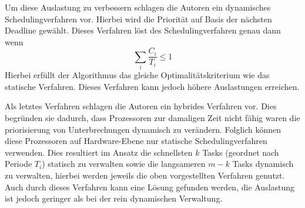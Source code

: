 \documentclass[DIN, pagenumber=false, fontsize=11pt, parskip=half]{scrartcl}
\begin{document}
\begin{enumerate}[label=\alph*)]
            Um diese Auslastung zu verbessern schlagen die Autoren ein dynamisches
            Schedulingverfahren vor. Hierbei wird die Priorität auf Basis der nächsten
            Deadline gewählt. Dieses Verfahren löst des Schedulingverfahren genau dann
            wenn
            \begin{equation}
                \sum_i \frac{C_i}{T_i} \leq 1
            \end{equation} 
            Hierbei erfüllt der Algorithmus das gleiche Optimalitätskriterium wie das
            statische Verfahren. Dieses Verfahren kann jedoch höhere Auslastungen
            erreichen.

            Als letztes Verfahren schlagen die Autoren ein hybrides Verfahren vor.
            Dies begründen sie dadurch, dass Prozessoren zur damaligen Zeit nicht
            fähig waren die priorisierung von Unterbrechungen dynamisch zu verändern.
            Folglich können diese Prozessoren auf Hardware-Ebene nur statische
            Schedulingverfahren verwenden. Dies resultiert im Ansatz die schnellsten
            $k$ Tasks (geordnet nach Periode $T_i$) statisch zu verwalten sowie
            die langsameren $m-k$ Tasks dynamisch zu verwalten, hierbei werden jeweils
            die oben vorgestellten Verfahren genutzt. Auch durch dieses Verfahren kann
            eine Lösung gefunden werden, die Auslastung ist jedoch geringer als bei der
            rein dynamischen Verwaltung.
    \end{enumerate}
\end{document}
